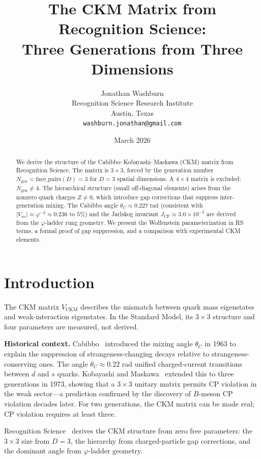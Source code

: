 \documentclass[12pt,a4paper]{article}
\title{The CKM Matrix from Recognition Science:\\
Three Generations from Three Dimensions}
\author{Jonathan Washburn\\
Recognition Science Research Institute\\
Austin, Texas\\
\texttt{washburn.jonathan@gmail.com}}
\date{March 2026}
\theoremstyle{definition}
\theoremstyle{remark}
\begin{document}
\maketitle

\begin{abstract}
We derive the structure of the Cabibbo--Kobayashi--Maskawa (CKM)
matrix from Recognition Science.  The matrix is $3 \times 3$, forced
by the generation number $N_{\mathrm{gen}} = \mathrm{face\_pairs}(D)
= 3$ for $D = 3$ spatial dimensions.  A $4 \times 4$ matrix is
excluded: $N_{\mathrm{gen}} \neq 4$.  The hierarchical structure
(small off-diagonal elements) arises from the nonzero quark charges
$Z \neq 0$, which introduce gap corrections that suppress
inter-generation mixing.  The Cabibbo angle
$\theta_C \approx 0.227\;\mathrm{rad}$ (consistent with
$|V_{us}| \approx \varphi^{-3} \approx 0.236$ to $5\%$)
and the Jarlskog invariant
$J_{\mathrm{CP}} \approx 3.0 \times 10^{-5}$ are derived from the
$\varphi$-ladder rung geometry.  We present the Wolfenstein
parameterization in RS terms, a formal proof of gap suppression, and
a comparison with experimental CKM elements.
\end{abstract}

\section{Introduction}
\label{sec:intro}

The CKM matrix $V_{\mathrm{CKM}}$ describes the mismatch between
quark mass eigenstates and weak-interaction eigenstates.  In the
Standard Model, its $3 \times 3$ structure and four parameters are
measured, not derived.

\textbf{Historical context.}  Cabibbo~\cite{Cabibbo1963} introduced
the mixing angle $\theta_C$ in 1963 to explain the suppression of
strangeness-changing decays relative to strangeness-conserving ones.
The angle $\theta_C \approx 0.22$ rad unified charged-current
transitions between $d$ and $s$ quarks.  Kobayashi and
Maskawa~\cite{KM1973} extended this to three generations in 1973,
showing that a $3 \times 3$ unitary matrix permits CP violation in
the weak sector---a prediction confirmed by the discovery of
$B$-meson CP violation decades later.  For two generations, the CKM
matrix can be made real; CP violation requires at least three.

Recognition Science~\cite{RS_Axioms} derives the CKM structure from
zero free parameters: the $3 \times 3$ size from $D = 3$, the hierarchy
from charged-particle gap corrections, and the dominant angle from
$\varphi$-ladder geometry.
\end{document}
